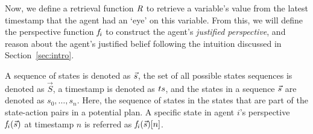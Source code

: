Now, we  define a retrieval function $\mathit{R}$ to retrieve a variable's value from the latest timestamp that the agent had an `eye' on this variable. From this, we will define the perspective function $\mathit{f}_i$ to construct the agent's \emph{justified perspective}, and reason about the agent's justified belief following the intuition discussed in Section~\ref{sec:intro}.

A sequence of states is denoted as $\Vec{s}$, the set of all possible states sequences is denoted as $\vec{S}$, a timestamp is denoted as $ts$, and the states in a sequence $\Vec{s}$ are denoted as $s_0,\dots,s_n$. Here, the sequence of states in the states that are part of the state-action pairs in a potential plan.
A specific state in agent $i$'s perspective $\mathit{f}_i(\Vec{s})$ at timestamp $n$ is referred as $\mathit{f}_i(\Vec{s})[n]$.


\begin{comment}
\begin{definition}[Observation function]
\label{def:Observation_function}
    The Observation Function for agent $i$, $\observation_i: \mathcal{S} \rightarrow \mathcal{S}$ can be defined as: 
    \[
    \observation_i(s) = \{ v \rightarrow s(v) \mid \triangleright_i(s,v) \}
    \]

\end{definition}

This is the same as the perspective function $f$ defined by \citet{Hu2022-ul} in their PWP approach. 
The function $\observation_i(s)$ contains all the variables and their values that are visible to agent $i$ in state $s$.


It is up to the modeller to model the assumptions of the domain.
For example, one common assumption is that the agents has the common knowledge of the domain $D$.
Then, a variable $v$ with $|D_v|=1$ must always return by the observation function $O_i$ for any agent $i$.
However, as in \cite{Hu2022-ul}, the observation function must have the following properties:

\vspace{2mm}
\begin{tabular}{ll}
 (1) & $\observation_i(s) \subseteq s$ \\[1mm]
 (2) & $\observation_i(s) = \observation_i(\observation_i(s))$\\[1mm]
 (3) & If $s \subseteq s'$, then $\observation_i(s) \subseteq \observation_i(s')$
\end{tabular}
\vspace{2mm}
\end{comment}


